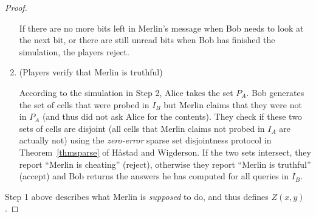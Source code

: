 \documentclass[11pt]{article}
\begin{document}
\begin{proof}
\begin{enumerate}[Step 1:]
		If there are no more bits left in Merlin's message when Bob needs to look at the next bit, or there are still unread bits when Bob has finished the simulation, the players reject. 
		
\item
		(Players verify that Merlin is truthful)
		
		According to the simulation in Step 2, Alice takes the set $P_A$. Bob generates the set of cells that were probed in $I_B$ but Merlin claims that they were not in $P_A$ (and thus did not ask Alice for the contents). They check if these two sets of cells are disjoint (all cells that Merlin claims not probed in $I_A$ are actually not) using the \emph{zero-error} sparse set disjointness protocol in Theorem~\ref{thmsparse} of H\aa{}stad and Wigderson. If the two sets intersect, they report ``Merlin is cheating'' (reject), otherwise they report ``Merlin is truthful'' (accept) and Bob returns the answers he has computed for all queries in $I_B$. 
		
\end{enumerate}

Step 1 above describes what Merlin is \emph{supposed} to do, and thus defines $Z(x, y)$. 
\iftoggle{conf}{
We can show that the protocol is a valid protocol in \mm{}, and solves the communication game efficiently. The detailed proof can be found in the full version.
}{
The following shows that the above protocol is a valid protocol in \mm{}, and solves the communication game efficiently. 

}
\end{proof}
\end{document}
